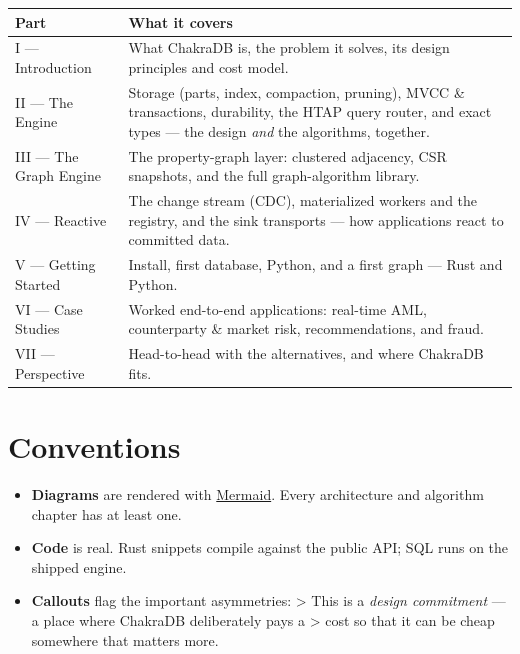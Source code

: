 \documentclass[
  11pt,
  openany]{book}
\providecommand{\tightlist}{%
  \setlength{\itemsep}{0pt}\setlength{\parskip}{0pt}}
\begin{document}
\begin{longtable}[]{@{}
  >{\raggedright\arraybackslash}p{}
  >{\raggedright\arraybackslash}p{}@{}}
\toprule\noalign{}
\begin{minipage}[b]{\linewidth}\raggedright
Part
\end{minipage} & \begin{minipage}[b]{\linewidth}\raggedright
What it covers
\end{minipage} \\
\midrule\noalign{}
\endhead
\bottomrule\noalign{}
\endlastfoot
I --- Introduction & What ChakraDB is, the problem it solves, its design
principles and cost model. \\
II --- The Engine & Storage (parts, index, compaction, pruning), MVCC \&
transactions, durability, the HTAP query router, and exact types --- the
design \emph{and} the algorithms, together. \\
III --- The Graph Engine & The property-graph layer: clustered
adjacency, CSR snapshots, and the full graph-algorithm library. \\
IV --- Reactive & The change stream (CDC), materialized workers and the
registry, and the sink transports --- how applications react to
committed data. \\
V --- Getting Started & Install, first database, Python, and a first
graph --- Rust and Python. \\
VI --- Case Studies & Worked end-to-end applications: real-time AML,
counterparty \& market risk, recommendations, and fraud. \\
VII --- Perspective & Head-to-head with the alternatives, and where
ChakraDB fits. \\
\end{longtable}

\section{Conventions}\label{conventions}

\begin{itemize}
\tightlist
\item
  \textbf{Diagrams} are rendered with
  \href{https://mermaid.js.org/}{Mermaid}. Every architecture and
  algorithm chapter has at least one.
\item
  \textbf{Code} is real. Rust snippets compile against the public API;
  SQL runs on the shipped engine.
\item
  \textbf{Callouts} flag the important asymmetries: \textgreater{} This
  is a \emph{design commitment} --- a place where ChakraDB deliberately
  pays a \textgreater{} cost so that it can be cheap somewhere that
  matters more.
\end{itemize}
\end{document}
